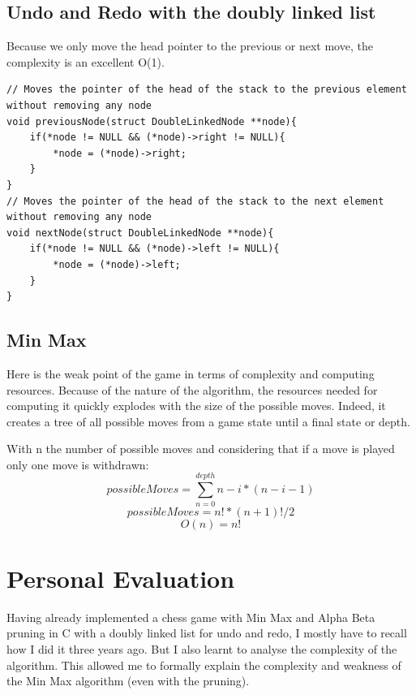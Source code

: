 \documentclass[10pt, a4paper]{article}
\begin{document}
\subsection{Undo and Redo with the doubly linked list}
Because we only move the head pointer to the previous or next move, the complexity is an excellent O(1).

\begin{lstlisting}
// Moves the pointer of the head of the stack to the previous element without removing any node
void previousNode(struct DoubleLinkedNode **node){
	if(*node != NULL && (*node)->right != NULL){
		*node = (*node)->right;
	}
}
// Moves the pointer of the head of the stack to the next element without removing any node
void nextNode(struct DoubleLinkedNode **node){
	if(*node != NULL && (*node)->left != NULL){
		*node = (*node)->left;
	}
}
\end{lstlisting}

\subsection{Min Max}
Here is the weak point of the game in terms of complexity and computing resources. Because of the nature of the algorithm, the resources needed for computing it quickly explodes with the size of the possible moves. Indeed, it creates a tree of all possible moves from a game state until a final state or depth.

With n the number of possible moves and considering that if a move is played only one move is withdrawn:
\begin{equation}
possibleMoves = \sum_{n=0}^{depth} n-i*(n-i-1)
\end{equation}
\begin{equation}
possibleMoves = n!*(n+1)!/2
\end{equation}
\begin{equation}
O(n) = n!
\end{equation}

\section{Personal Evaluation}
Having already implemented a chess game \cite{game} with Min Max and Alpha Beta pruning in C with a doubly linked list for undo and redo, I mostly have to recall how I did it three years ago. But I also learnt to analyse the complexity of the algorithm. This allowed me to formally explain the complexity and weakness of the Min Max algorithm (even with the pruning).



		
\end{document}
